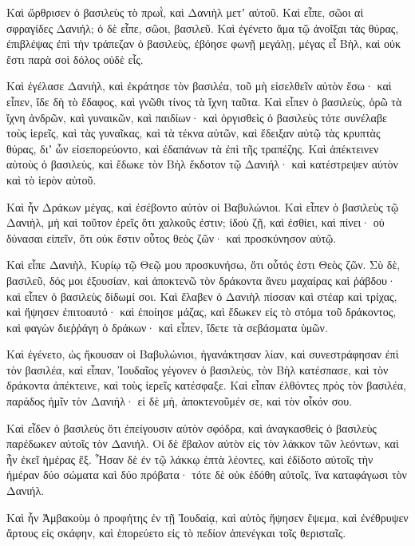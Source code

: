 {\par }{\PP {}Καὶ ὤρθρισεν ὁ βασιλεὺς τὸ πρωῒ, καὶ Δανιὴλ μετʼ αὐτοῦ.
Καὶ εἶπε, σῶοι αἱ σφραγίδες Δανιήλ; ὁ δὲ εἶπε, σῶοι, βασιλεῦ.
Καὶ ἐγένετο ἅμα τῷ ἀνοῖξαι τὰς θύρας, ἐπιβλέψας ἐπὶ τὴν τράπεζαν ὁ βασιλεὺς, ἐβόησε φωνῇ μεγάλῃ, μέγας εἶ Βὴλ, καὶ οὐκ ἔστι παρὰ σοὶ δόλος οὐδὲ εἷς.
\par }{\PP {}Καὶ ἐγέλασε Δανιὴλ, καὶ ἐκράτησε τὸν βασιλέα, τοῦ μὴ εἰσελθεῖν αὐτὸν ἔσω· καὶ εἶπεν, ἴδε δὴ τὸ ἔδαφος, καὶ γνῶθι τίνος τὰ ἴχνη ταῦτα.
Καὶ εἶπεν ὁ βασιλεὺς, ὁρῶ τὰ ἴχνη ἀνδρῶν, καὶ γυναικῶν, καὶ παιδίων· καὶ ὀργισθεὶς ὁ βασιλεὺς τότε συνέλαβε τοὺς ἱερεῖς, καὶ τὰς γυναῖκας,
καὶ τὰ τέκνα αὐτῶν, καὶ ἔδειξαν αὐτῷ τὰς κρυπτὰς θύρας, διʼ ὧν εἰσεπορεύοντο, καὶ ἐδαπάνων τὰ ἐπὶ τῆς τραπέζης.
Καὶ ἀπέκτεινεν αὐτοὺς ὁ βασιλεὺς, καὶ ἔδωκε τὸν Βὴλ ἔκδοτον τῷ Δανιήλ· καὶ κατέστρεψεν αὐτὸν καὶ τὸ ἱερὸν αὐτοῦ.
\par }{\PP {}Καὶ ἦν Δράκων μέγας, καὶ ἐσέβοντο αὐτὸν οἱ Βαβυλώνιοι.
Καὶ εἶπεν ὁ βασιλεὺς τῷ Δανιὴλ, μὴ καὶ τοῦτον ἐρεῖς ὅτι χαλκοῦς ἐστιν; ἰδοὺ ζῇ, καὶ ἐσθίει, καὶ πίνει· οὐ δύνασαι εἰπεῖν, ὅτι οὐκ ἔστιν οὗτος θεὸς ζῶν· καὶ προσκύνησον αὐτῷ.
\par }{\PP {}Καὶ εἶπε Δανιὴλ, Κυρίῳ τῷ Θεῷ μου προσκυνήσω, ὅτι οὗτός ἐστι Θεὸς ζῶν.
Σὺ δὲ, βασιλεῦ, δός μοι ἐξουσίαν, καὶ ἀποκτενῶ τὸν δράκοντα ἄνευ μαχαίρας καὶ ῥάβδου· καὶ εἶπεν ὁ βασιλεὺς δίδωμί σοι.
Καὶ ἔλαβεν ὁ Δανιὴλ πίσσαν καὶ στέαρ καὶ τρίχας, καὶ ἥψησεν ἐπιτοαυτό· καὶ ἐποίησε μάζας, καὶ ἔδωκεν εἰς τὸ στόμα τοῦ δράκοντος, καὶ φαγὼν διεῤῥάγη ὁ δράκων· καὶ εἶπεν, ἴδετε τὰ σεβάσματα ὑμῶν.
\par }{\PP {}Καὶ ἐγένετο, ὡς ἤκουσαν οἱ Βαβυλώνιοι, ἠγανάκτησαν λίαν, καὶ συνεστράφησαν ἐπὶ τὸν βασιλέα, καὶ εἶπαν, Ἰουδαῖος γέγονεν ὁ βασιλεὺς, τὸν Βὴλ κατέσπασε, καὶ τὸν δράκοντα ἀπέκτεινε, καὶ τοὺς ἱερεῖς κατέσφαξε.
Καὶ εἶπαν ἐλθόντες πρὸς τὸν βασιλέα, παράδος ἡμῖν τὸν Δανιήλ· εἰ δὲ μὴ, ἁποκτενοῦμέν σε, καὶ τὸν οἶκόν σου.
\par }{\PP {}Καὶ εἶδεν ὁ βασιλεὺς ὅτι ἐπείγουσιν αὐτὸν σφόδρα, καὶ ἀναγκασθεὶς ὁ βασιλεὺς παρέδωκεν αὐτοῖς τὸν Δανιήλ.
Οἱ δὲ ἔβαλον αὐτὸν εἰς τὸν λάκκον τῶν λεόντων, καὶ ἦν ἐκεῖ ἡμέρας ἕξ.
Ἦσαν δὲ ἐν τῷ λάκκῳ ἑπτὰ λέοντες, καὶ ἐδίδοτο αὐτοῖς τὴν ἡμέραν δύο σώματα καὶ δύο πρόβατα· τότε δὲ οὐκ ἐδόθη αὐτοῖς, ἵνα καταφάγωσι τὸν Δανιήλ.
\par }{\PP {}Καὶ ἦν Ἀμβακοὺμ ὁ προφήτης ἐν τῇ Ἰουδαίᾳ, καὶ αὐτὸς ἥψησεν ἕψεμα, καὶ ἐνέθρυψεν ἄρτους εἰς σκάφην, καὶ ἑπορεύετο εἰς τὸ πεδίον ἀπενέγκαι τοῖς θερισταῖς.
}
